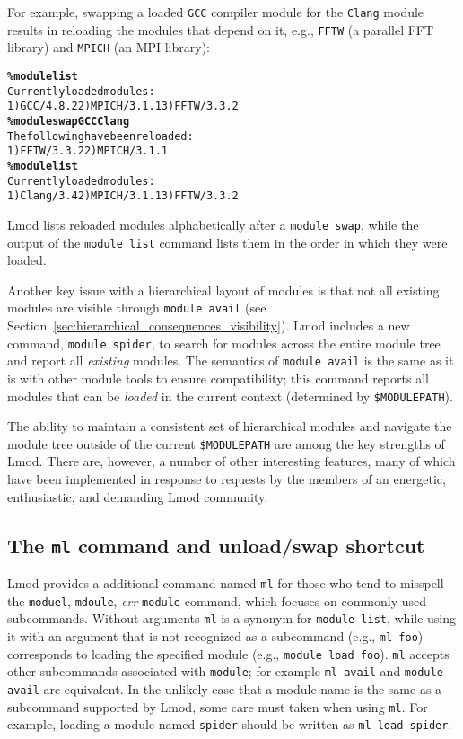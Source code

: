 For example, swapping a loaded \texttt{\small GCC} compiler module for the
\texttt{\small {Clang}} module results in reloading the modules that
depend on it, e.g., \texttt{\small FFTW} (a parallel FFT library) and
\texttt{\small MPICH} (an MPI library):
{\small
  \begin{alltt}
    \textbf{\% module list}
    Currently loaded modules:
    1) GCC/4.8.2  2) MPICH/3.1.1  3) FFTW/3.3.2
    \textbf{\% module swap GCC Clang}
    The following have been reloaded:
    1) FFTW/3.3.2  2) MPICH/3.1.1
    \textbf{\% module list}
    Currently loaded modules:
    1) Clang/3.4  2) MPICH/3.1.1  3) FFTW/3.3.2
\end{alltt}
}
\noindent
Lmod lists reloaded modules
alphabetically after a \texttt{\small module swap}, while the output of
the \texttt{\small module list} command lists them in the order in which
they were loaded.

Another key issue with a hierarchical layout of modules is that not all
existing modules are visible through \texttt{\small module avail} (see
Section~\ref{sec:hierarchical_consequences_visibility}). Lmod includes a
new command, \texttt{\small module spider}, to search for modules across the
entire module tree and report all \emph{existing} modules. The semantics of
\texttt{\small module avail} is the same as it is with other module tools to ensure
compatibility; this command reports all modules that can be \emph{loaded} in the
current context (determined by \texttt{\small \$MODULEPATH}).

The ability to maintain a consistent set of hierarchical modules and navigate the
module tree outside of the current \texttt{\small \$MODULEPATH} are among the key
strengths of Lmod. There are, however, a number of other interesting features, many
of which have been implemented in response to requests by the members of an
energetic, enthusiastic, and demanding Lmod community.

\subsection{The \texttt{\small ml} command and unload/swap shortcut}

Lmod provides a additional command named \texttt{\small ml} for those who tend to
misspell the \texttt{\small moduel}, \texttt{\small mdoule}, \emph{err}
\texttt{\small module} command, which focuses on
commonly used subcommands. Without arguments \texttt{\small ml} is a synonym for
\texttt{\small module list}, while using it with an argument that is not
recognized as a subcommand (e.g., \texttt{\small ml foo}) corresponds to loading
the specified module (e.g., \texttt{\small module load foo}).
\texttt{\small ml} accepts other subcommands associated with \texttt{\small module};
for example \texttt{\small ml avail} and \texttt{\small module avail} are equivalent.
In the unlikely case that a module name is the same as a subcommand supported by Lmod, 
some care must taken when using \texttt{\small ml}. For example, loading a module
named \texttt{\small spider} should be written as \texttt{\small ml load spider}.


